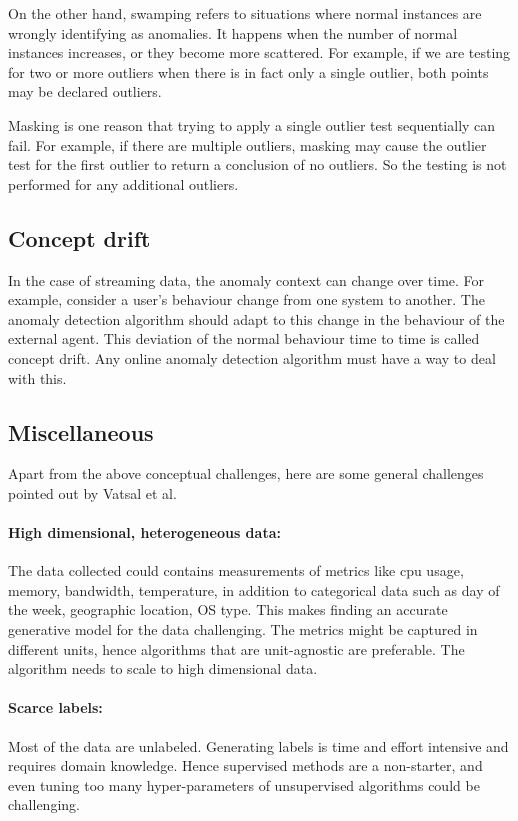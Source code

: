 On the other hand, swamping refers to situations where normal instances are wrongly identifying as anomalies.
It happens when the number of normal instances increases, or they become more scattered.
For example, if we are testing for two or more outliers when there is in fact only a single outlier, both points may be declared outliers.

Masking is one reason that trying to apply a single outlier test sequentially can fail.
For example, if there are multiple outliers, masking may cause the outlier test for the first outlier to return a conclusion of no outliers.
So the testing is not performed for any additional outliers.

\subsection{Concept drift}
\label{subsec:concept-drift}

In the case of streaming data, the anomaly context can change over time.
For example, consider a user's behaviour change from one system to another.
The anomaly detection algorithm should adapt to this change in the behaviour of the external agent.
This deviation of the normal behaviour time to time is called concept drift.
Any online anomaly detection algorithm must have a way to deal with this.

\subsection{Miscellaneous}
\label{subsec:misc-challenges}

Apart from the above conceptual challenges, here are some general challenges pointed out by Vatsal et al. \cite{NIPS2019_9710}

\paragraph{High dimensional, heterogeneous data:}
The data collected could contains measurements of metrics like cpu usage, memory, bandwidth, temperature, in addition to categorical data such as day of the week, geographic location, OS type. 
This makes finding an accurate generative model for the data challenging. 
The metrics might be captured in different units, hence algorithms that are unit-agnostic are preferable. 
The algorithm needs to scale to high dimensional data.

\paragraph{Scarce labels:} Most of the data are unlabeled. Generating labels is time and effort intensive
and requires domain knowledge. Hence supervised methods are a non-starter, and even
tuning too many hyper-parameters of unsupervised algorithms could be challenging.


